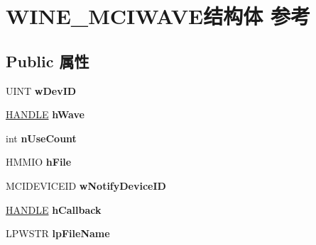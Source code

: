 \hypertarget{struct_w_i_n_e___m_c_i_w_a_v_e}{}\section{W\+I\+N\+E\+\_\+\+M\+C\+I\+W\+A\+V\+E结构体 参考}
\label{struct_w_i_n_e___m_c_i_w_a_v_e}
\subsection*{Public 属性}
\begin{DoxyCompactItemize}
\item 
\mbox{\label{struct_w_i_n_e___m_c_i_w_a_v_e_ad8ab9499e2f8b926e60dd7820d2bc318}} 
U\+I\+NT {\bfseries w\+Dev\+ID}
\item 
\mbox{\label{struct_w_i_n_e___m_c_i_w_a_v_e_af80d71bc69b109e111ff02f88c78c440}} 
\hyperlink{interfacevoid}{H\+A\+N\+D\+LE} {\bfseries h\+Wave}
\item 
\mbox{\label{struct_w_i_n_e___m_c_i_w_a_v_e_ab4d247505a5662be538af3e1f126052b}} 
int {\bfseries n\+Use\+Count}
\item 
\mbox{\label{struct_w_i_n_e___m_c_i_w_a_v_e_a6d9611dabeebb958381c9b2f90e21c9b}} 
H\+M\+M\+IO {\bfseries h\+File}
\item 
\mbox{\label{struct_w_i_n_e___m_c_i_w_a_v_e_a6eaa5b1dfe924e2711f7f5cebde283ed}} 
M\+C\+I\+D\+E\+V\+I\+C\+E\+ID {\bfseries w\+Notify\+Device\+ID}
\item 
\mbox{\label{struct_w_i_n_e___m_c_i_w_a_v_e_a5553da7d36f2188123bc7e96b9ed6836}} 
\hyperlink{interfacevoid}{H\+A\+N\+D\+LE} {\bfseries h\+Callback}
\item 
\mbox{\label{struct_w_i_n_e___m_c_i_w_a_v_e_a9df4b1b344cc62fce2e61c616a410cd6}} 
L\+P\+W\+S\+TR {\bfseries lp\+File\+Name}
\item 
\mbox{\label{struct_w_i_n_e___m_c_i_w_a_v_e_a5c684e9b37c49e23b272c48cebf60b0a}} 

\end{DoxyCompactItemize}
